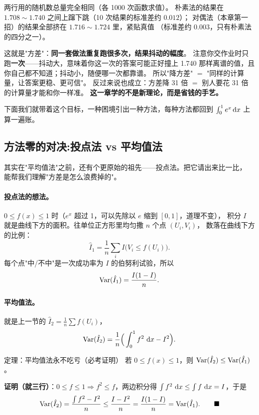 两行用的随机数总量完全相同（各 1000 次函数求值）。
朴素法的结果在 $1.708\sim1.740$ 之间上蹿下跳（10 次结果的标准差约 $0.012$）；
对偶法（本章第一招）的结果全部挤在 $1.716\sim1.724$ 里，紧贴真值
（标准差约 $0.003$，只有朴素法的四分之一）。

\begin{pbox}
这就是"方差"：\textbf{同一套做法重复跑很多次，结果抖动的幅度}。
注意你交作业时只跑\textbf{一次}——抖动大，意味着你这一次的答案可能正好撞上
1.740 那样离谱的值，且你自己都不知道；抖动小，随便哪一次都靠谱。
所以"降方差" $=$ "同样的计算量，让答案更稳、更可信"。
反过来说也成立：方差降 31 倍 $=$ 别人要花 31 倍的计算量才能和你一样准。
\textbf{这一章学的不是新理论，而是省钱的手艺。}
\end{pbox}

下面我们就带着这个目标，一种困境引出一种方法，每种方法都回到
$\int_0^1e^x\,\mathrm{d} x$ 上算一遍账。

\subsection{方法零的对决:投点法 vs 平均值法}

其实在"平均值法"之前，还有个更原始的祖先——投点法。把它请出来比一比，
能帮我们理解"方差是怎么浪费掉的"。

\paragraph{投点法的想法。}
$0\le f(x)\le 1$ 时（$e^x$ 超过 1，可以先除以 $e$ 缩到 $[0,1]$，道理不变），
积分 $I$ 就是曲线下方的面积。往单位正方形里均匀撒 $n$ 个点 $(U_i,V_i)$，
数落在曲线下方的比例：
\[
\hat I_1=\frac1n\sum_i I\big(V_i\le f(U_i)\big).
\]
每个点"中/不中"是一次成功率为 $I$ 的伯努利试验，所以
\[
\mathrm{Var}(\hat I_1)=\frac{I(1-I)}{n}.
\]

\paragraph{平均值法。}就是上一节的 $\hat I_2=\frac1n\sum f(U_i)$，
\[
\mathrm{Var}(\hat I_2)=\frac1n\Big(\int_0^1 f^2\,\,\mathrm{d} x-I^2\Big).
\]

\begin{kbox}{定理：平均值法永不吃亏（必考证明）}
若 $0\le f(x)\le1$，则 $\mathrm{Var}(\hat I_2)\le\mathrm{Var}(\hat I_1)$。

\textbf{证明（就三行）}：$0\le f\le1\Rightarrow f^2\le f$，两边积分得
$\int f^2\,\,\mathrm{d} x\le\int f\,\,\mathrm{d} x=I$，于是
\[
\mathrm{Var}(\hat I_2)=\frac{\int f^2-I^2}{n}\le\frac{I-I^2}{n}=\frac{I(1-I)}{n}=\mathrm{Var}(\hat I_1).\qquad\blacksquare
\]
\end{kbox}


